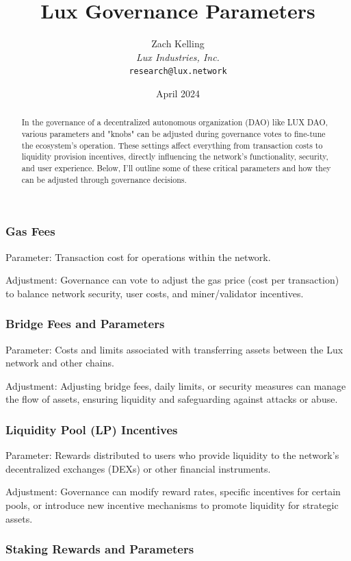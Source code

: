 \documentclass[11pt]{article}
\title{Lux Governance Parameters}
\author{Zach Kelling\\\textit{Lux Industries, Inc.}\\\texttt{research@lux.network}}
\date{April 2024}
\begin{document}
\luxcoverpage

\begin{abstract}
In the governance of a decentralized autonomous organization (DAO) like LUX DAO, various parameters and "knobs" can be adjusted during governance votes to fine-tune the ecosystem's operation. These settings affect everything from transaction costs to liquidity provision incentives, directly influencing the network's functionality, security, and user experience. Below, I'll outline some of these critical parameters and how they can be adjusted through governance decisions.
\end{abstract}

\tableofcontents
\newpage


\subsubsection{Gas Fees}

Parameter: Transaction cost for operations within the network.


Adjustment: Governance can vote to adjust the gas price (cost per transaction) to balance network security, user costs, and miner/validator incentives.


\subsubsection{Bridge Fees and Parameters}

Parameter: Costs and limits associated with transferring assets between the Lux network and other chains.


Adjustment: Adjusting bridge fees, daily limits, or security measures can manage the flow of assets, ensuring liquidity and safeguarding against attacks or abuse.


\subsubsection{Liquidity Pool (LP) Incentives}

Parameter: Rewards distributed to users who provide liquidity to the network's decentralized exchanges (DEXs) or other financial instruments.


Adjustment: Governance can modify reward rates, specific incentives for certain pools, or introduce new incentive mechanisms to promote liquidity for strategic assets.


\subsubsection{Staking Rewards and Parameters}
\end{document}
